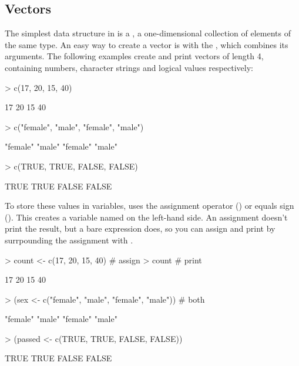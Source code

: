 \subsection{Vectors}
The simplest data structure in \R is a , a one-dimensional
collection of elements of the same type. An easy way to create a vector is with
the , which combines its arguments.  The following examples create
and print vectors of length 4, containing numbers, character strings and
logical values respectively:

\begin{Schunk}
\begin{Sinput}
> c(17, 20, 15, 40)
\end{Sinput}
\begin{Soutput}
[1] 17 20 15 40
\end{Soutput}
\begin{Sinput}
> c("female", "male", "female", "male")
\end{Sinput}
\begin{Soutput}
[1] "female" "male"   "female" "male"  
\end{Soutput}
\begin{Sinput}
> c(TRUE, TRUE, FALSE, FALSE)
\end{Sinput}
\begin{Soutput}
[1]  TRUE  TRUE FALSE FALSE
\end{Soutput}
\end{Schunk}

To store these values in variables, \R uses the assignment operator (\code{<-})
or equals sign (\code{=}). This creates a variable named on the left-hand side.
An assignment doesn't print the result, but a bare expression does, so you can
assign and print by surrpounding the assignment with \code{()}.

\begin{Schunk}
\begin{Sinput}
> count <- c(17, 20, 15, 40)                       # assign
> count                                            # print
\end{Sinput}
\begin{Soutput}
[1] 17 20 15 40
\end{Soutput}
\begin{Sinput}
> (sex <- c("female", "male", "female", "male"))   # both
\end{Sinput}
\begin{Soutput}
[1] "female" "male"   "female" "male"  
\end{Soutput}
\begin{Sinput}
> (passed <- c(TRUE, TRUE, FALSE, FALSE))
\end{Sinput}
\begin{Soutput}
[1]  TRUE  TRUE FALSE FALSE
\end{Soutput}
\end{Schunk}

